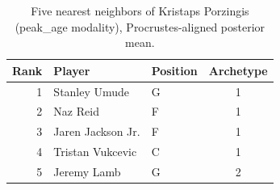 \begin{table}[htbp]
  \centering\small
  \begin{tabular}{rllc}
    \toprule
    Rank & Player & Position & Archetype \\
    \midrule
    1 & Stanley Umude & G & 1 \\
    2 & Naz Reid & F & 1 \\
    3 & Jaren Jackson Jr. & F & 1 \\
    4 & Tristan Vukcevic & C & 1 \\
    5 & Jeremy Lamb & G & 2 \\
    \bottomrule
  \end{tabular}
  \caption{Five nearest neighbors of Kristaps Porzingis (peak_age modality), Procrustes-aligned posterior mean.}
  \label{tab:Kristaps_Porzingis_neighbors_peak_age}
\end{table}

